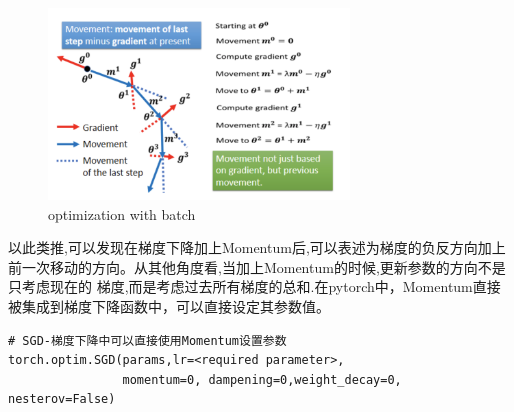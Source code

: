 \documentclass{article}
\begin{document}
\begin{figure}[H]
    \centering
    \includegraphics[width=8cm]{picture/Momentum.png}
    \caption{optimization with batch}
    \label{fig:galxy}
\end{figure}
\indent 以此类推,可以发现在梯度下降加上Momentum后,可以表述为梯度的负反方向加上前一次移动的方向。从其他角度看,当加上Momentum的时候,更新参数的方向不是只考虑现在的 梯度,而是考虑过去所有梯度的总和.在pytorch中，Momentum直接被集成到梯度下降函数中，可以直接设定其参数值。
\begin{lstlisting}
# SGD-梯度下降中可以直接使用Momentum设置参数
torch.optim.SGD(params,lr=<required parameter>,
                momentum=0, dampening=0,weight_decay=0, nesterov=False)
\end{lstlisting}
\newpage
\end{document}
